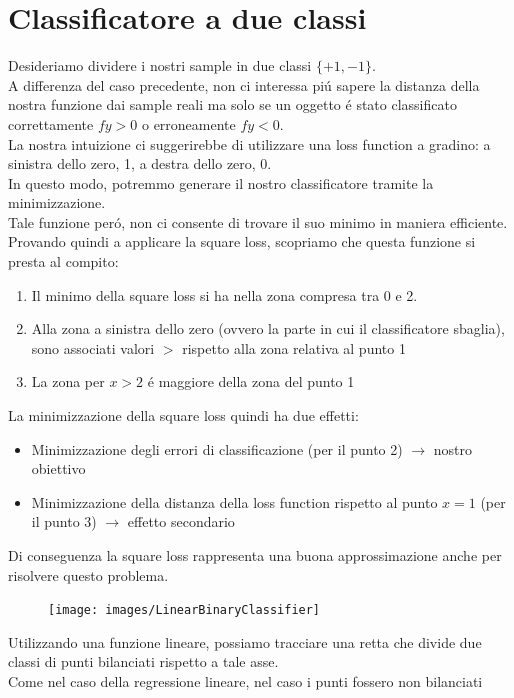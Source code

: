 \documentclass[12pt]{article}
\begin{document}
\section{Classificatore a due classi}
Desideriamo dividere i nostri sample in due classi $\{+1,-1\}$. \\
A differenza del caso precedente, non ci interessa piú sapere la distanza
della nostra funzione dai sample reali ma solo se un oggetto é stato classificato
correttamente $fy>0$ o erroneamente $fy<0$. \\
La nostra intuizione ci suggerirebbe di utilizzare una loss function a gradino:
a sinistra dello zero, 1, a destra dello zero, 0. \\
In questo modo, potremmo generare il nostro classificatore tramite la minimizzazione. \\
Tale funzione peró, non ci consente di trovare il suo minimo in maniera efficiente. \\
Provando quindi a applicare la square loss, scopriamo che questa funzione si presta al compito:
\begin{enumerate}
  \item Il minimo della square loss si ha nella zona compresa tra 0 e 2.
  \item Alla zona a sinistra dello zero (ovvero la parte in cui il classificatore sbaglia), sono associati valori $>$ rispetto alla zona relativa al punto 1
  \item La zona per $x > 2$ é maggiore della zona del punto 1
\end{enumerate}
La minimizzazione della square loss quindi ha due effetti:
\begin{itemize}
  \item Minimizzazione degli errori di classificazione (per il punto 2) $\rightarrow$ nostro obiettivo
  \item Minimizzazione della distanza della loss function rispetto al punto $x=1$ (per il punto 3) $\rightarrow$ effetto secondario
\end{itemize}
Di conseguenza la square loss rappresenta una buona approssimazione anche per risolvere questo problema.
\begin{figure}[H]
  \centering
  \texttt{[image: images/LinearBinaryClassifier]}
\end{figure}
Utilizzando una funzione lineare, possiamo tracciare una retta
che divide due classi di punti bilanciati rispetto a tale asse. \\
Come nel caso della regressione lineare, nel caso i punti fossero non bilanciati
\end{document}
